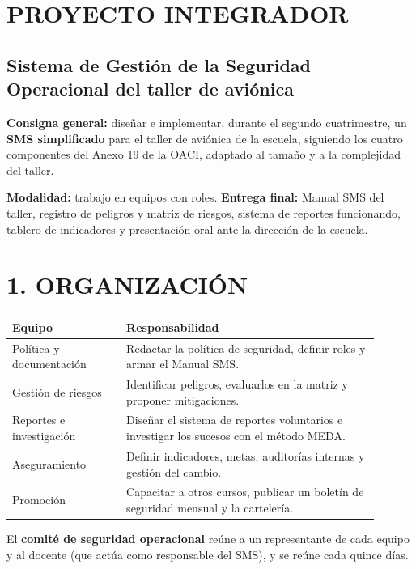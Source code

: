 \clearpage
\section*{PROYECTO INTEGRADOR}
\subsection*{Sistema de Gestión de la Seguridad Operacional del taller de aviónica}

\begin{recuadro}
\textbf{Consigna general:} diseñar e implementar, durante el segundo cuatrimestre, un
\textbf{SMS simplificado} para el taller de aviónica de la escuela, siguiendo los cuatro
componentes del Anexo 19 de la OACI, adaptado al tamaño y a la complejidad del taller.

\textbf{Modalidad:} trabajo en equipos con roles. \textbf{Entrega final:} Manual SMS del taller,
registro de peligros y matriz de riesgos, sistema de reportes funcionando, tablero de indicadores
y presentación oral ante la dirección de la escuela.
\end{recuadro}

\section*{1. ORGANIZACIÓN}
\begin{center}
\small
\begin{tabular}{|p{0.28\linewidth}|p{0.62\linewidth}|}
\hline
\textbf{Equipo} & \textbf{Responsabilidad} \\ \hline
Política y documentación & Redactar la política de seguridad, definir roles y armar el Manual
SMS. \\ \hline
Gestión de riesgos & Identificar peligros, evaluarlos en la matriz y proponer mitigaciones. \\
\hline
Reportes e investigación & Diseñar el sistema de reportes voluntarios e investigar los sucesos
con el método MEDA. \\ \hline
Aseguramiento & Definir indicadores, metas, auditorías internas y gestión del cambio. \\ \hline
Promoción & Capacitar a otros cursos, publicar un boletín de seguridad mensual y la cartelería. \\
\hline
\end{tabular}
\end{center}
El \textbf{comité de seguridad operacional} reúne a un representante de cada equipo y al docente
(que actúa como responsable del SMS), y se reúne cada quince días.

